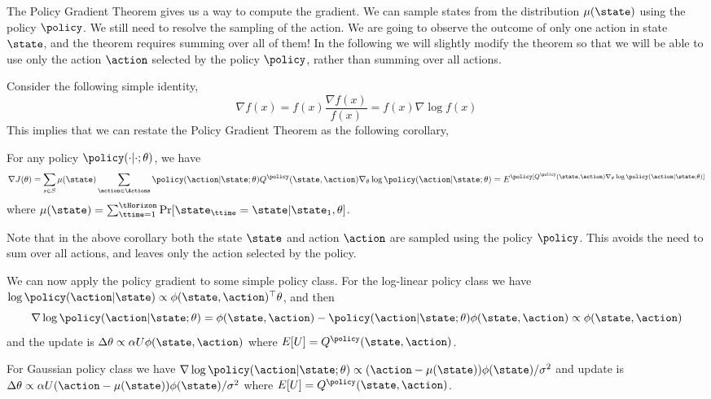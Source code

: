 The Policy Gradient Theorem gives us a way to compute the gradient.
We can sample states from the distribution $\mu(\state)$ using the
policy $\policy$. We still need to resolve the sampling of the
action. We are going to observe the outcome of only one action in
state $\state$, and the theorem requires summing over all of them!
In the following we will slightly modify the theorem so that we will
be able to use only the action $\action$ selected by the policy
$\policy$, rather than summing over all actions.

Consider the following simple identity,
\[
\nabla f(x)=f(x)\frac{\nabla f(x)}{f(x)}=f(x)\nabla \log f(x)
\]
This implies that we can restate the Policy Gradient Theorem as the
following corollary,
\begin{corollary}
\label{thm:policy-gradient} For any policy
$\policy(\cdot|\cdot;\theta)$, we have
\[
\nabla J(\theta)= \sum_{s\in S} \mu(\state) \sum_{\action\in
\Actions} \policy(\action|\state;\theta) Q^\policy
(\state,\action)\nabla_\theta \log \policy(\action|\state;\theta) =
E^\policy[Q^\policy (\state,\action)\nabla_\theta \log
\policy(\action|\state;\theta)]
\]
where $\mu(\state)=\sum_{\ttime=1}^\tHorizon\Pr[\state_\ttime=\state|\state_1,\theta]$.
\end{corollary}
Note that in the above corollary both the state $\state$ and action
$\action$ are sampled using the policy $\policy$. This avoids the need to sum over all actions, and leaves only the action selected by the policy.

We can now apply the policy gradient to some simple policy
class. For the log-linear policy class we have $\log
\policy(\action|\state)\propto \phi(\state,\action)^\top \theta$,
and then
\[
\nabla \log \policy(\action|\state;\theta)= \phi(\state,\action) - \policy(\action|\state;\theta)\phi(\state,\action)\propto \phi(\state,\action)
\]
and the update is $\Delta\theta \propto \alpha U
\phi(\state,\action)$ where $E[U]=Q^\policy(\state,\action)$.

For Gaussian policy class we have $\nabla \log
\policy(\action|\state;\theta)\propto
(\action-\mu(\state))\phi(\state)/\sigma^2$ and update is
$\Delta\theta \propto \alpha U
(\action-\mu(\state))\phi(\state)/\sigma^2$ where
$E[U]=Q^\policy(\state,\action)$.

